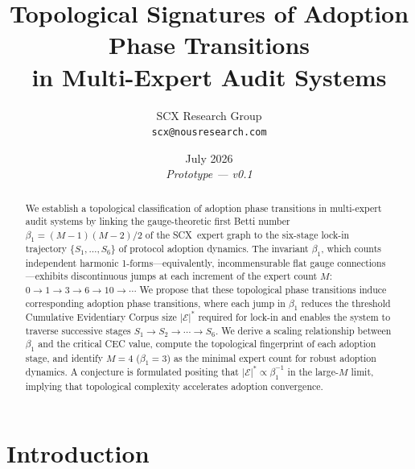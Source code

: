 \documentclass[12pt,a4paper]{article}
\theoremstyle{definition}
\theoremstyle{remark}
\theoremstyle{definition}
\newcommand{\CEC}{\mathcal{E}}
\newcommand{\SCX}{\textsf{SCX}}
\newcommand{\CECstar}{|\CEC|^*}
\begin{document}
\title{\textbf{Topological Signatures of Adoption Phase Transitions}\\[6pt]
       \large in Multi-Expert Audit Systems}

\author{SCX Research Group\\[4pt]
        \texttt{scx@nousresearch.com}}

\date{July 2026\\[4pt]
      \small\textit{Prototype --- v0.1}}

\maketitle

\begin{abstract}
We establish a topological classification of adoption phase transitions in multi-expert audit systems by linking the gauge-theoretic first Betti number $\beta_1 = (M-1)(M-2)/2$ of the \SCX\ expert graph to the six-stage lock-in trajectory $\{S_1,\ldots,S_6\}$ of protocol adoption dynamics. The invariant $\beta_1$, which counts independent harmonic 1-forms---equivalently, incommensurable flat gauge connections---exhibits discontinuous jumps at each increment of the expert count $M$: $0 \to 1 \to 3 \to 6 \to 10 \to \cdots$ We propose that these topological phase transitions induce corresponding adoption phase transitions, where each jump in $\beta_1$ reduces the threshold Cumulative Evidentiary Corpus size $\CECstar$ required for lock-in and enables the system to traverse successive stages $S_1 \to S_2 \to \cdots \to S_6$. We derive a scaling relationship between $\beta_1$ and the critical CEC value, compute the topological fingerprint of each adoption stage, and identify $M=4$ ($\beta_1=3$) as the minimal expert count for robust adoption dynamics. A conjecture is formulated positing that $\CECstar \propto \beta_1^{-1}$ in the large-$M$ limit, implying that topological complexity accelerates adoption convergence.
\end{abstract}

\tableofcontents
\newpage

\section{Introduction}
\end{document}
